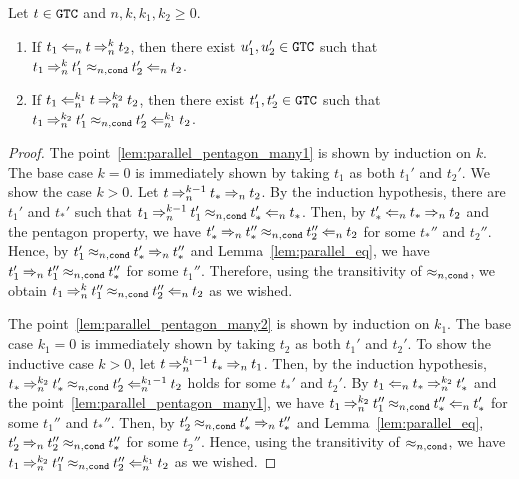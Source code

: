 \begin{lemma}\label{lem:parallel_pentagon_many}
  Let $t \in {\tt GTC}$ and $n,k,k_1,k_2\ge 0$. 
  \begin{enumerate}
  \item\label{lem:parallel_pentagon_many1}
    If $t_1 \mathbin{\Leftarrow_{n}} t \mathbin{\Rightarrow_{n}^{k}} t_2$,
    then there exist $u_1',u_2'\in {\tt GTC}$
    such that $t_1 \mathbin{\Rightarrow_{n}^{k}} t_1' \mathbin{\approx_{n,{\tt cond}}} t_2' \mathbin{\Leftarrow_{n}} t_2$.
  \item\label{lem:parallel_pentagon_many2}
    If $t_1 \mathbin{\Leftarrow_{n}^{k_1}} t \mathbin{\Rightarrow_{n}^{k_2}} t_2$,
    then there exist $t_1',t_2'\in {\tt GTC}$
    such that $t_1 \mathbin{\Rightarrow_{n}^{k_2}} t_1' \mathbin{\approx_{n,{\tt cond}}} t_2' \mathbin{\Leftarrow_{n}^{k_1}} t_2$.
  \end{enumerate}
\end{lemma}
\begin{proof}
  The point~\ref{lem:parallel_pentagon_many1} is shown by induction on $k$.
  The base case $k=0$ is immediately shown by taking $t_1$ as both $t_1'$ and $t_2'$.
  We show the case $k>0$.
  Let $t \mathbin{\Rightarrow_{n}^{k-1}} t_* \mathbin{\Rightarrow_{n}} t_2$.
  By the induction hypothesis, there are $t_1'$ and $t_*'$ such that 
  $t_1 \mathbin{\Rightarrow_{n}^{k-1}} t_1' \mathbin{\approx_{n,{\tt cond}}} t_*' \mathbin{\Leftarrow_{n}} t_*$.
  Then, by $t_*' \mathbin{\Leftarrow_{n}} t_* \mathbin{\Rightarrow_{n}} t_2$ and the pentagon property,
  we have $t_*' \mathbin{\Rightarrow_{n}} t_*'' \mathbin{\approx_{n,{\tt cond}}} t_2'' \mathbin{\Leftarrow_{n}} t_2$ for some $t_*''$ and $t_2''$. 
  Hence, by $t_1' \mathbin{\approx_{n,{\tt cond}}} t_*' \mathbin{\Rightarrow_{n}} t_*''$ and Lemma~\ref{lem:parallel_eq},
  we have $t_1' \mathbin{\Rightarrow_{n}} t_1'' \mathbin{\approx_{n,{\tt cond}}} t_*''$ for some $t_1''$.
  Therefore, using the transitivity of $\mathbin{\approx_{n,{\tt cond}}}$,
  we obtain $t_1 \mathbin{\Rightarrow_{n}^{k}} t_1'' \mathbin{\approx_{n,{\tt cond}}} t_2'' \mathbin{\Leftarrow_{n}} t_2$ as we wished. 
  
  The point~\ref{lem:parallel_pentagon_many2} is shown by induction on $k_1$.  
  The base case $k_1=0$ is immediately shown by taking $t_2$ as both $t_1'$ and $t_2'$.
  To show the inductive case $k>0$, let $t \mathbin{\Rightarrow_{n}^{k_1-1}} t_* \mathbin{\Rightarrow_{n}} t_1$.
  Then, by the induction hypothesis,
  $t_* \mathbin{\Rightarrow_{n}^{k_2}} t_*' \mathbin{\approx_{n,{\tt cond}}} t_2' \mathbin{\Leftarrow_{n}^{k_1-1}} t_2$ holds
  for some $t_*'$ and $t_2'$. 
  By $t_1 \mathbin{\Leftarrow_{n}} t_* \mathbin{\Rightarrow_{n}^{k_2}} t_*'$ and the point~\ref{lem:parallel_pentagon_many1},
  we have $t_1 \mathbin{\Rightarrow_{n}^{k_2}} t_1'' \mathbin{\approx_{n,{\tt cond}}} t_*'' \mathbin{\Leftarrow_{n}} t_*'$
  for some $t_1''$ and $t_*''$. 
  Then, by $t_2' \mathbin{\approx_{n,{\tt cond}}} t_*' \mathbin{\Rightarrow_{n}} t_*''$ and Lemma~\ref{lem:parallel_eq},
  $t_2' \mathbin{\Rightarrow_{n}} t_2'' \mathbin{\approx_{n,{\tt cond}}} t_*''$ for some $t_2''$.
  Hence, using the transitivity of $\mathbin{\approx_{n,{\tt cond}}}$, we have
  $t_1 \mathbin{\Rightarrow_{n}^{k_2}} t_1'' \mathbin{\approx_{n,{\tt cond}}} t_2'' \mathbin{\Leftarrow_{n}^{k_1}} t_2$ as we wished.
\end{proof}


